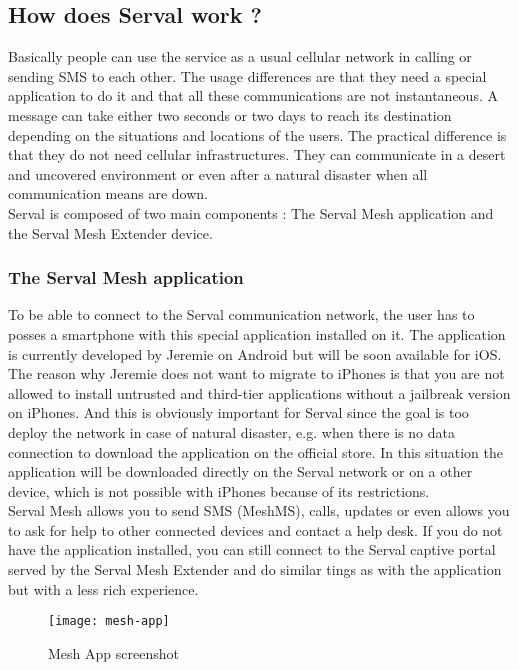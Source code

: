 \subsection{How does Serval work ?}
Basically people can use the service as a usual cellular network in calling or sending SMS to each other. The usage differences are that they need a special application to do it and that all these communications are not instantaneous. A message can take either two seconds or two days to reach its destination depending on the situations and locations of the users. The practical difference is that they do not need cellular infrastructures. They can communicate in a desert and uncovered environment or even after a natural disaster when all communication means are down.\\
Serval is composed of two main components : The Serval Mesh application and the Serval Mesh Extender device. 

\subsubsection{The Serval Mesh application}
To be able to connect to the Serval communication network, the user has to posses a smartphone with this special application installed on it. The application is currently developed by Jeremie on Android but will be soon available for iOS. The reason why Jeremie does not want to migrate to iPhones is that you are not allowed to install untrusted and third-tier applications without a jailbreak version on iPhones. And this is obviously important for Serval since the goal is too deploy the network in case of natural disaster, e.g. when there is no data connection to download the application on the official store. In this situation the application will be downloaded directly on the Serval network or on a other device, which is not possible with iPhones because of its restrictions. \\
Serval Mesh allows you to send SMS (MeshMS), calls, updates or even allows you to ask for help to other connected devices and contact a help desk. If you do not have the application installed, you can still connect to the Serval captive portal served by the Serval Mesh Extender and do similar tings as with the application but with a less rich experience.
\begin{figure}[h]
\centering
\texttt{[image: mesh-app]}
\caption{Mesh App screenshot}
\end{figure}


